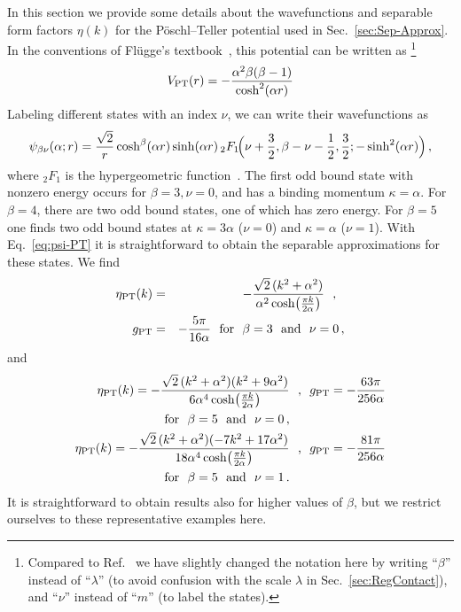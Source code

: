   In this section we provide some details about the wavefunctions and separable
  form factors $\eta(k)$ for the Pöschl--Teller potential used in
  Sec.~\ref{sec:Sep-Approx}.  In the conventions of Fl\"{u}gge's
  textbook~\cite{Fluegge:1999}, this potential can be written as
  \footnote{Compared to Ref.~\cite{Fluegge:1999} we have slightly changed the
  notation here by writing
  ``$\beta$'' instead of ``$\lambda$'' (to avoid confusion with the scale
  $\lambda$ in Sec.~\ref{sec:RegContact}), and ``$\nu$'' instead of ``$m$''
  (to label the states).}
  \begin{equation}
  V_{\text{PT}}(r) = -\frac{\alpha^2 \beta(\beta-1)}{\cosh^2(\alpha r)}
  \label{eq:V-PT-app}
  \end{equation}
  Labeling different states with an index $\nu$, we can write their
  wavefunctions as
  \begin{equation}
  \psi_{\beta\nu}(\alpha;r) = \frac{\sqrt{2}}{r}\cosh^\beta(\alpha r)
  \sinh(\alpha r) \,
  {_2F_1}\!\Bigl(\nu+\frac32,\beta-\nu-\frac12,\frac32;
  -\sinh^2(\alpha r)\Bigr) \,,
  \label{eq:psi-PT}
  \end{equation}
  where $_2F_1$ is the hypergeometric function~\cite{Olver:2010:NHMF}.
  The first odd bound state with nonzero energy occurs for $\beta=3,
  \nu=0$, and has a binding momentum $\kappa=\alpha$.  For $\beta=4$,
  there are two odd bound states, one of which has zero energy.  For
  $\beta=5$ one finds two odd bound states at $\kappa=3\alpha$ ($\nu=0$)
  and $\kappa=\alpha$ ($\nu=1$).  With Eq.~\eqref{eq:psi-PT} it is
  straightforward to obtain the separable approximations for these
  states.  We find
  \begin{eqnarray}
   \eta_{\text{PT}}(k) &=& -\frac{\sqrt{2}\,(k^2+\alpha^2)}
   {\alpha^2\cosh\!\left(\frac{\pi k}{2\alpha}\right)} \ \ \text{,}\ \ 
    \nonumber \\
   g_{\text{PT}} &=& -\frac{5\pi}{16\alpha}
   \ \ \text{for}\ \  \beta = 3 \ \ \text{and}\ \  \nu = 0 \,,
  \label{eq:eta-PT-3}
  \end{eqnarray}
  and
  \begin{subequations}%
  \begin{align}
   \eta_{\text{PT}}(k) = -\frac{\sqrt{2}\,(k^2+\alpha^2)(k^2+9\alpha^2)}
   {6\alpha^4\cosh\!\left(\frac{\pi k}{2\alpha}\right)} &\ \ \text{,}\ \ 
   g_{\text{PT}} = -\frac{63\pi}{256\alpha}
   \nonumber \\
   \ \ \text{for}\ \  \beta = 5 \ \ \text{and}\ \  \nu = 0 \,, \\
   \eta_{\text{PT}}(k) = -\frac{\sqrt{2}\,(k^2+\alpha^2)(-7k^2+17\alpha^2)}
   {18\alpha^4\cosh\!\left(\frac{\pi k}{2\alpha}\right)} &\ \ \text{,}\ \ 
   g_{\text{PT}} = -\frac{81\pi}{256\alpha}
   \nonumber \\
   \ \ \text{for}\ \  \beta = 5 \ \ \text{and}\ \  \nu = 1 \,.
  \end{align}
  \label{eq:eta-PT-5}%
  \end{subequations}%
  It is straightforward to obtain results also for higher values of $\beta$, but
  we restrict ourselves to these representative examples here.
